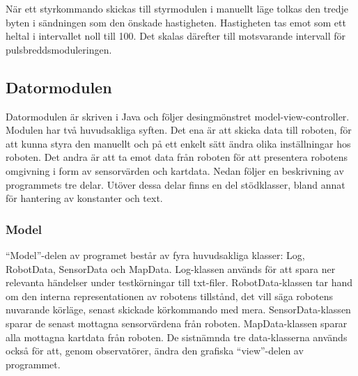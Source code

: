 \documentclass[11pt]{article}
\begin{document}
\begin{flushleft}
\begin{description}[style=unboxed, leftmargin=0cm]
När ett styrkommando skickas till styrmodulen i manuellt läge tolkas den tredje byten i sändningen som den önskade hastigheten. Hastigheten tas emot som ett heltal i intervallet noll till 100. Det skalas därefter till motsvarande intervall för pulsbreddsmoduleringen.

  \end{description}

\subsection{Datormodulen}
Datormodulen är skriven i Java och följer desingmönstret model-view-controller. Modulen har två huvudsakliga syften. Det ena är att skicka data till roboten, för att kunna styra den manuellt och på ett enkelt sätt ändra olika inställningar hos roboten. Det andra är att ta emot data från roboten för att presentera robotens omgivning i form av sensorvärden och kartdata. Nedan följer en beskrivning av programmets tre delar. Utöver dessa delar finns en del stödklasser, bland annat för hantering av konstanter och text.%

\subsubsection{Model}
``Model''-delen av programet består av fyra huvudsakliga klasser: Log, RobotData, SensorData och MapData. 
Log-klassen används för att spara ner relevanta händelser under testkörningar till txt-filer. 
RobotData-klassen tar hand om den interna representationen av robotens tillstånd, det vill säga robotens nuvarande körläge, senast skickade körkommando med mera. 
SensorData-klassen sparar de senast mottagna sensorvärdena från roboten. 
MapData-klassen sparar alla mottagna kartdata från roboten. De sistnämnda tre data-klasserna används också för att, genom observatörer, ändra den grafiska ``view''-delen av programmet.


\end{flushleft}
\end{document}
